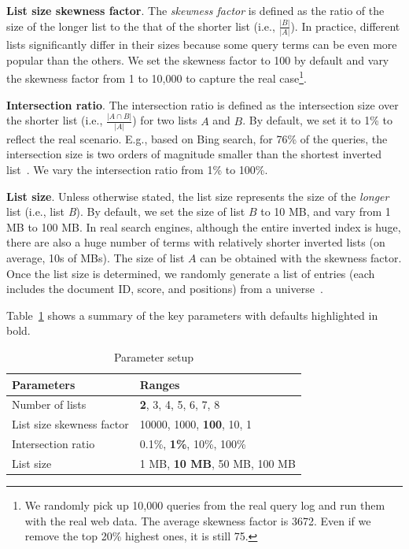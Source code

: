 \textbf{List size skewness factor}. The \emph{skewness factor} is defined as the ratio of the size of the longer list to the that of the shorter list (i.e., $\frac{|B|}{|A|}$). In practice, different lists significantly differ in their sizes because some query terms can be even more popular than the others. We set the skewness factor to 100 by default and vary the skewness factor from 1 to 10,000 to capture the real case\footnote{\small We randomly pick up 10,000 queries from the real query log and run them with the real web data. The average skewness factor is 3672. Even if we remove the top 20\% highest ones, it is still 75.}.

\textbf{Intersection ratio}. The intersection ratio is defined as the intersection size over the shorter list (i.e., $\frac{|A\cap B|}{|A|}$) for two lists $A$ and $B$. By default, we set it to 1\% to reflect the real scenario. E.g., based on Bing search, for 76\% of the queries, the intersection size is two orders of magnitude smaller than the shortest inverted list~\cite{Ding2011}. We vary the intersection ratio from 1\% to 100\%.


\textbf{List size}. Unless otherwise stated, the list size represents the size of the \emph{longer} list (i.e., list \emph{B}).
By default, we set the size of list $B$ to 10 MB, and vary from 1 MB to 100 MB. In real search engines, although the entire inverted index is huge, there are also a huge number of terms with relatively shorter inverted lists (on average, 10s of MBs). The size of list $A$ can be obtained with the skewness factor. Once the list size is determined, we randomly generate a list of entries (each includes the document ID, score, and positions) from a universe~\cite{Ding2011}.


Table~\ref{tab:synData} shows a summary of the key parameters with defaults highlighted in bold.

\begin{table}[tbp]
\centering\small
\begin{tabular}{l|l}\hline\hline
\textbf{Parameters}  &   \textbf{Ranges}   \\\hline
Number of lists & \textbf{2}, 3, 4, 5, 6, 7, 8\\\hline
List size skewness factor  & 10000, 1000, \textbf{100}, 10, 1\\\hline
Intersection ratio  &   0.1\%, \textbf{1\%}, 10\%, 100\%\\\hline
List size & 1 MB, \textbf{10 MB}, 50 MB, 100 MB\\\hline\hline
\end{tabular}
\caption{Parameter setup}\label{tab:synData}
\end{table}



